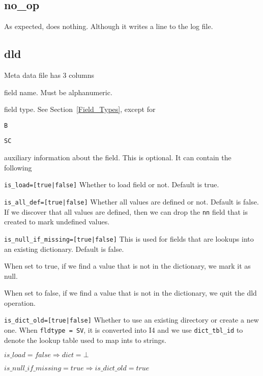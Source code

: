 \subsection{no\_op}
\label{no_op}

As expected, does nothing. Although it writes a line to the log file. 

\subsection{dld}
\label{dld}

Meta data file has 3 columns
\be
\item field name. Must be alphanumeric.
\item field type. See Section~\ref{Field_Types}, except for
\be
\item {\tt B}
\item {\tt SC}
\ee
\item auxiliary information about the field. This is optional. It can
contain the following
\be
\item \verb+is_load=[true|false]+ Whether to load field or not. Default
is true.
\item \verb+is_all_def=[true|false]+ Whether all values are defined or
not. Default is false. If we discover that all values are defined,
then we can drop the {\tt nn} field that is created to mark undefined
values.
\item \verb+is_null_if_missing=[true|false]+ This is used for fields
that are lookups into an existing dictionary. Default is false.  
\bi
\item When
set to true, if we find a value that is not in the dictionary, we mark
it as null.  
\item When set to false, if we find a value that is not in the
dictionary, we quit the dld operation.
\item \verb+is_dict_old=[true|false]+ Whether to use an existing
directory or create a new one.
\ei
\ee
\ee
When {\tt fldtype = SV}, it is converted into I4 and we use
\verb+dict_tbl_id+ to denote the lookup table used to map ints to
strings.

\begin{invariant}
\(is\_load = false \Rightarrow dict = \bot\)
\end{invariant}

\begin{invariant}
\(is\_null\_if\_missing = true \Rightarrow is\_dict\_old = true \)
\end{invariant}

